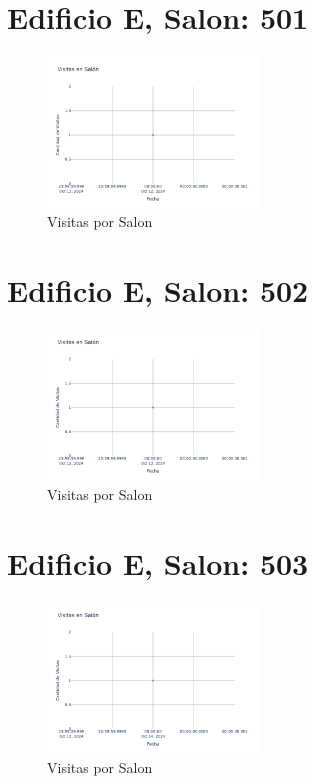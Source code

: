\documentclass{article}
\begin{document}
    

    \section{Edificio E, Salon: 501}
    \begin{figure}
        \centering
        \includegraphics[width=0.5\textwidth]{../img/poli/VS501-90Dias-03-12-2024.png}
        \caption{Visitas por Salon}
    \end{figure}

    

    \section{Edificio E, Salon: 502}
    \begin{figure}
        \centering
        \includegraphics[width=0.5\textwidth]{../img/poli/VS502-90Dias-03-12-2024.png}
        \caption{Visitas por Salon}
    \end{figure}

    

    \section{Edificio E, Salon: 503}
    \begin{figure}
        \centering
        \includegraphics[width=0.5\textwidth]{../img/poli/VS503-90Dias-03-12-2024.png}
        \caption{Visitas por Salon}
    \end{figure}
\end{document}
